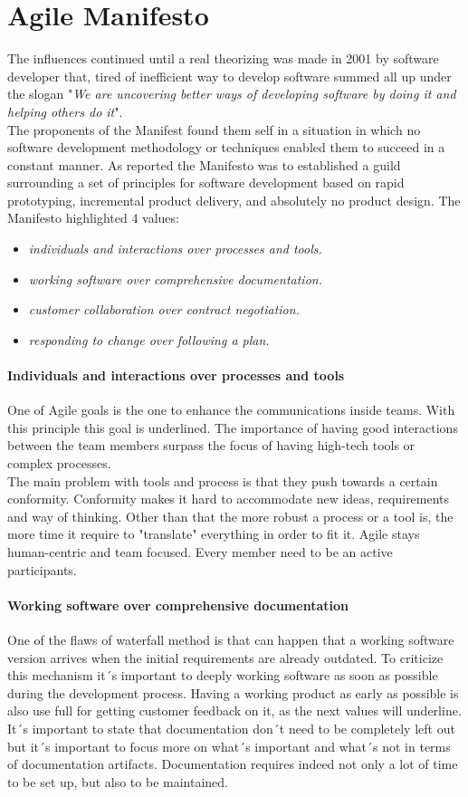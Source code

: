 \documentclass[../main.tex]{subfiles}
\begin{document}
\section{Agile Manifesto}
The influences continued until a real theorizing was made in 2001 by software developer that, tired of inefficient way to develop software summed all up under the slogan "\textit{We are uncovering better ways of developing software by doing it and helping others do it}". \\
The proponents of the Manifest found them self in a situation in which no software development methodology or techniques enabled them to succeed in a constant manner. As reported \citet{schmidt2013software} the Manifesto was to established a guild surrounding a set of principles for software development based on rapid prototyping, incremental product delivery, and absolutely no product design. The Manifesto highlighted 4 values:
\begin{itemize}
    \item \textit{individuals and interactions over processes and tools.}
    \item \textit{working software over comprehensive documentation.}
    \item \textit{customer collaboration over contract negotiation.}
    \item \textit{responding to change over following a plan.}
\end{itemize}

\paragraph{Individuals and interactions over processes and tools}
One of Agile goals is the one to enhance the communications inside teams. With this principle this goal is underlined. The importance of having good interactions between the team members surpass the focus of having high-tech tools or complex processes. \\
The main problem with tools and process is that they push towards a certain conformity. 
Conformity makes it hard to accommodate new ideas, requirements and way of thinking. 
Other than that the more robust a process or a tool is, the more time it require to "translate" everything in order to fit it. 
Agile stays human-centric and team focused. Every member need to be an active participants. 
\paragraph{Working software over comprehensive documentation}
One of the flaws of waterfall method is that can happen that a working software version arrives when the initial requirements are already outdated. To criticize this mechanism it´s important to deeply working software as soon as possible during the development process. Having a working product as early as possible is also use full for getting customer feedback on it, as the next values will underline. 
It´s important to state that documentation don´t need to be completely left out but it´s important to focus more on what´s important and what´s not in terms of documentation artifacts. Documentation requires indeed not only a lot of time to be set up, but also to be maintained. 
\end{document}

